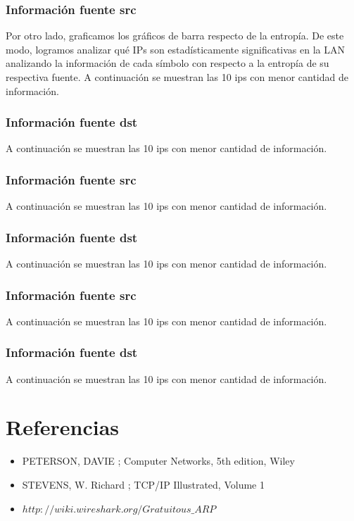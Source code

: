 \documentclass[10pt, a4paper]{article}
\begin{document}
\subsubsection{Informaci\'on fuente src}
Por otro lado, graficamos los gráficos de barra respecto de la entropía. De este modo, logramos analizar qué IPs son estadísticamente significativas en la LAN analizando la información de cada símbolo con respecto a la entropía de su respectiva fuente.
A continuaci\'on se muestran las 10 ips con menor cantidad de informaci\'on.

%
\vspace{2cm}

\subsubsection{Informaci\'on fuente dst}
A continuaci\'on se muestran las 10 ips con menor cantidad de informaci\'on.

%
\vspace{2cm}


\subsubsection{Informaci\'on fuente src}
A continuaci\'on se muestran las 10 ips con menor cantidad de informaci\'on.

%
\vspace{2cm}

\subsubsection{Informaci\'on fuente dst}
A continuaci\'on se muestran las 10 ips con menor cantidad de informaci\'on.

%
\vspace{2cm}


\subsubsection{Informaci\'on fuente src}
A continuaci\'on se muestran las 10 ips con menor cantidad de informaci\'on.

%
\vspace{2cm}

\subsubsection{Informaci\'on fuente dst}
A continuaci\'on se muestran las 10 ips con menor cantidad de informaci\'on.

%
\vspace{2cm}

\section{Referencias}
\begin{itemize}
\item PETERSON, DAVIE ; Computer Networks, 5th edition, Wiley
\item STEVENS, W. Richard ; TCP/IP Illustrated, Volume 1

\item $http://wiki.wireshark.org/Gratuitous\_ARP$
\end{itemize}
\end{document}
